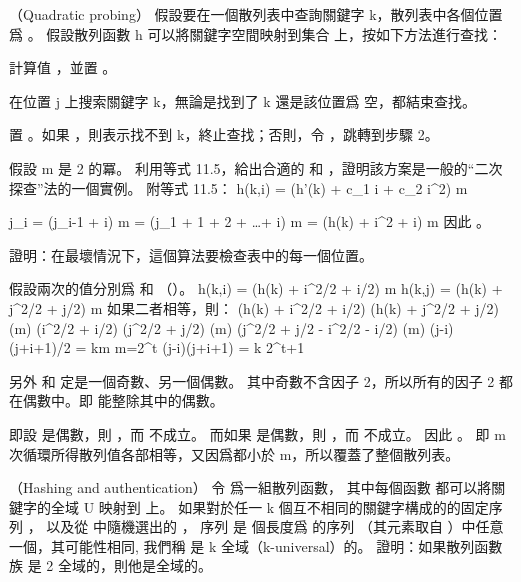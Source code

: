 \stopigBase
\stopPROBLEM

\startPROBLEM
（Quadratic probing）
假設要在一個散列表中查詢關鍵字 k，散列表中各個位置爲 。
假設散列函數 h 可以將關鍵字空間映射到集合  上，按如下方法進行查找：
\startigBase[n]
\item 計算值 ，並置 。
\item 在位置 j 上搜索關鍵字 k，無論是找到了 k 還是該位置爲 空，都結束查找。
\item 置 。如果 ，則表示找不到 k，終止查找；否則，令 ，跳轉到步驟 2。
\stopigBase

假設 m 是 2 的冪。
\startigBase[a]
\startitem
利用等式 11.5，給出合適的  和 ，證明該方案是一般的“二次探查”法的一個實例。
附等式 11.5：
\startformula
h(k,i) = (h'(k) + c_1 i + c_2 i^2) \mod m
\stopformula
\stopitem

\startANSWER
\startformula
j_i
  = (j_{i-1} + i) \mod m
  = (j_1 + 1 + 2 + \ldots + i) \mod m
  = (h(k) + i^2 + i) \mod m
\stopformula
因此 。
\stopANSWER

\startitem
證明：在最壞情況下，這個算法要檢查表中的每一個位置。
\stopitem

\startANSWER
假設兩次的值分別爲  和  （）。
\startformula\startmathalignment[n=1]
\NC h(k,i) = (h(k) + i^2/2 + i/2) \mod m \NR
\NC h(k,j) = (h(k) + j^2/2 + j/2) \mod m \NR
\stopmathalignment\stopformula
如果二者相等，則：
\startformula\startmathalignment[n=1]
\NC (h(k) + i^2/2 + i/2) \equiv (h(k) + j^2/2 + j/2) (\mod m) \NR
\NC (i^2/2 + i/2) \equiv (j^2/2 + j/2) (\mod m) \NR
\NC (j^2/2 + j/2 - i^2/2 - i/2)  (\mod m) \NR
\NC (j-i)(j+i+1)/2 = km \qquad {}m=2^t\NR
\NC (j-i)(j+i+1) = k 2^{t+1} \NR
\stopmathalignment\stopformula

另外  和  定是一個奇數、另一個偶數。
其中奇數不含因子 2，所以所有的因子 2 都在偶數中。即  能整除其中的偶數。

即設  是偶數，則 ，而  不成立。
而如果  是偶數，則 ，而  不成立。
因此 。
即 m 次循環所得散列值各部相等，又因爲都小於 m，所以覆蓋了整個散列表。
\stopANSWER

\stopigBase
\stopPROBLEM

\startPROBLEM
（Hashing and authentication）
令  爲一組散列函數，
其中每個函數  都可以將關鍵字的全域 U 映射到  上。
如果對於任一 k 個互不相同的關鍵字構成的的固定序列 ，
以及從  中隨機選出的 ，
序列  是  個長度爲  的序列
（其元素取自 ）中任意一個，其可能性相同,
我們稱  是 {\EMP k 全域}（k-universal）的。
\startigBase[a]
\startitem%
證明：如果散列函數族  是 2 全域的，則他是全域的。
\stopitem

